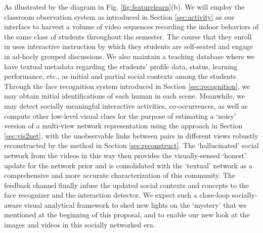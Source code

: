 As illustrated by the diagram in Fig. \ref{fig:featurelearn}(b). We will employ the classroom observation system as introduced in Section \ref{sec:activity} as our interface to harvest a volume of video sequences recording the indoor behaviors of the same class of students throughout the semester. The course that they enroll in uses interactive instruction by which they students are self-seated and engage in ad-hocly grouped discussions. We also maintain a teaching database where we have textual metadata regarding the students' profile data, status, learning performance, etc., as initial and partial social contexts among the students. Through the face recognition system introduced in Section \ref{sec:recognition}, we may obtain initial identifications of each human in each scene. Meanwhile, we may detect socially meaningful interactive activities, co-occurrences, as well as compute other low-level visual clues for the purpose of estimating a `noisy' version of a multi-view network representation using the approach in Section \ref{sec:vis2net}, with the unobservable links between pairs in different views robustly reconstructed by the method in Section \ref{sec:reconstruct}. The `hallucinated' social network from the videos in this way then provides the visually-sensed `honest' update for the network prior and is consolidated with the `textual' network as a comprehensive and more accurate characterization of this community. The feedback channel finally infuse the updated social contexts and concepts to the face recognizer and the interaction detector. We expect such a close-loop socially-aware visual analytical framework to shed new lights on the `mystery' that we mentioned at the beginning of this proposal, and to enable our new look at the images and videos in this socially networked era.


